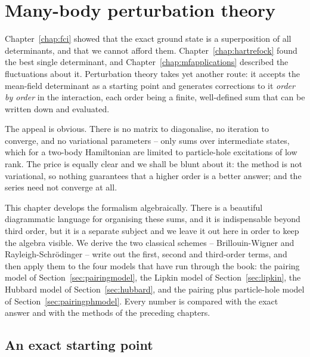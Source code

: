 \chapter{Many-body perturbation theory}
\label{chap:mbpt}

Chapter~\ref{chap:fci} showed that the exact ground state is a superposition
of all determinants, and that we cannot afford them.  Chapter~\ref{chap:hartrefock}
found the best single determinant, and Chapter~\ref{chap:mfapplications}
described the fluctuations about it.  Perturbation theory takes yet another
route: it accepts the mean-field determinant as a starting point and generates
corrections to it \emph{order by order} in the interaction, each order being a
finite, well-defined sum that can be written down and evaluated.

The appeal is obvious.  There is no matrix to diagonalise, no iteration to
converge, and no variational parameters -- only sums over intermediate states,
which for a two-body Hamiltonian are limited to particle-hole excitations of
low rank.  The price is equally clear and we shall be blunt about it: the
method is not variational, so nothing guarantees that a higher order is a
better answer; and the series need not converge at all.

This chapter develops the formalism algebraically.  There is a beautiful
diagrammatic language for organising these sums, and it is indispensable
beyond third order, but it is a separate subject and we leave it out here in
order to keep the algebra visible.  We derive the two classical schemes --
Brillouin-Wigner and Rayleigh-Schr\"odinger -- write out the first, second and
third-order terms, and then apply them to the four models that have run
through the book: the pairing model of Section~\ref{sec:pairingmodel}, the
Lipkin model of Section~\ref{sec:lipkin}, the Hubbard model of
Section~\ref{sec:hubbard}, and the pairing plus particle-hole model of
Section~\ref{sec:pairingphmodel}.  Every number is compared with the exact
answer and with the methods of the preceding chapters.

\section{An exact starting point}
\label{sec:exactstart}

